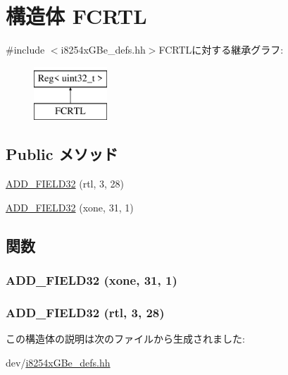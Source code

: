 \hypertarget{structiGbReg_1_1Regs_1_1FCRTL}{
\section{構造体 FCRTL}
\label{structiGbReg_1_1Regs_1_1FCRTL}
}


{\ttfamily \#include $<$i8254xGBe\_\-defs.hh$>$}FCRTLに対する継承グラフ:\begin{figure}[H]
\begin{center}
\leavevmode
\includegraphics[height=2cm]{structiGbReg_1_1Regs_1_1FCRTL}
\end{center}
\end{figure}
\subsection*{Public メソッド}
\begin{DoxyCompactItemize}
\item 
\hyperlink{structiGbReg_1_1Regs_1_1FCRTL_a400603710cee5be097cc0a168f616334}{ADD\_\-FIELD32} (rtl, 3, 28)
\item 
\hyperlink{structiGbReg_1_1Regs_1_1FCRTL_a1344c9a69b0cc2da6e93900e0511b77e}{ADD\_\-FIELD32} (xone, 31, 1)
\end{DoxyCompactItemize}


\subsection{関数}
\hypertarget{structiGbReg_1_1Regs_1_1FCRTL_a1344c9a69b0cc2da6e93900e0511b77e}{
\subsubsection[{ADD\_\-FIELD32}]{\setlength{\rightskip}{0pt plus 5cm}ADD\_\-FIELD32 (xone, \/  31, \/  1)}}
\label{structiGbReg_1_1Regs_1_1FCRTL_a1344c9a69b0cc2da6e93900e0511b77e}
\hypertarget{structiGbReg_1_1Regs_1_1FCRTL_a400603710cee5be097cc0a168f616334}{
\subsubsection[{ADD\_\-FIELD32}]{\setlength{\rightskip}{0pt plus 5cm}ADD\_\-FIELD32 (rtl, \/  3, \/  28)}}
\label{structiGbReg_1_1Regs_1_1FCRTL_a400603710cee5be097cc0a168f616334}


この構造体の説明は次のファイルから生成されました:\begin{DoxyCompactItemize}
\item 
dev/\hyperlink{i8254xGBe__defs_8hh}{i8254xGBe\_\-defs.hh}\end{DoxyCompactItemize}
